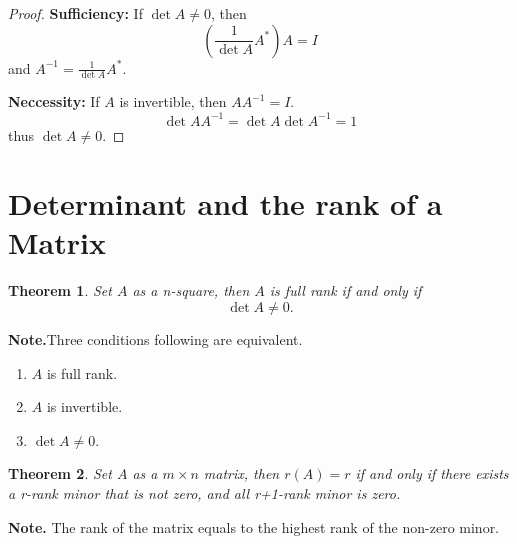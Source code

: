 \documentclass{article}
\newtheorem{theorem}{Theorem}[section]
\theoremstyle{definition}
\begin{document}
\begin{proof}
    \textbf{Sufficiency:}
    If $\det A\neq 0$, then 
    $$(\frac{1}{\det A}A^{*})A=I$$
    and $A^{-1}=\frac{1}{\det A}A^{*}.$

    \textbf{Neccessity:}
    If $A$ is invertible, then $AA^{-1}=I$.
    $$\det AA^{-1}=\det{A} \det A^{-1}=1$$
    thus $\det A \neq 0$.
\end{proof}
 
\section{Determinant and the rank of a Matrix}
\begin{theorem}
    Set $A$ as a n-square, then $A$ is full rank if and only if
    $$\det A \neq 0.$$
\end{theorem}


\textbf{Note.}Three conditions following are equivalent.
\begin{enumerate}
    \item $A$ is full rank.
    \item $A$ is invertible.
    \item $\det A \neq 0$.
\end{enumerate}

\begin{theorem}
    Set $A$ as a $m\times n$ matrix, then $r(A)=r$ if
    and only if there exists a r-rank minor that is not zero,
    and all r+1-rank minor is zero.
\end{theorem}
\textbf{Note.} The rank of the matrix equals to the highest rank 
of the non-zero minor.
\end{document}
